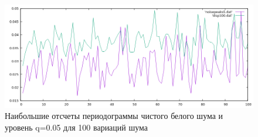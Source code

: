 \documentclass[12pt]{article}
\begin{document}
		\begin{figure}[h]
			\centering
			\includegraphics[width=14cm]{peaksdisp5.png} 
			\caption{Наибольшие отсчеты периодограммы чистого белого шума и уровень q=0.05 для 100 вариаций шума} 
			\label{fig.0} 
		\end{figure}		
				
		
		
\end{document}
